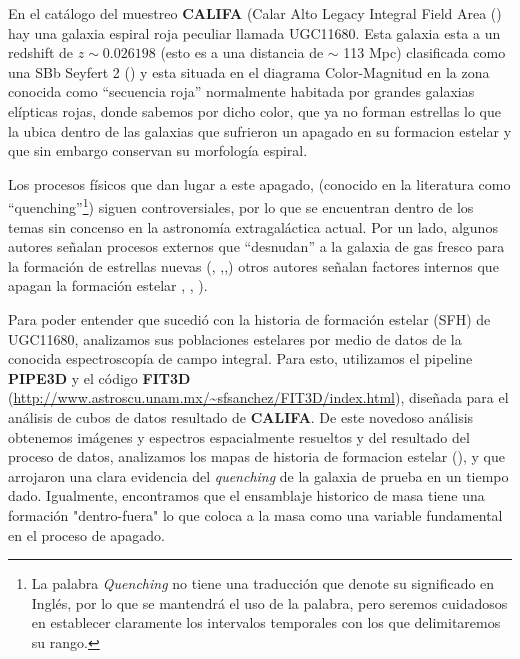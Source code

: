 


\begin{abstracts}        %

En el catálogo del muestreo \textbf{CALIFA} (Calar Alto Legacy Integral Field Area  (\citet{sanchez2012}) hay una galaxia espiral roja peculiar llamada UGC11680. Esta galaxia esta a un redshift de $z \sim 0.026198$ (esto es a una distancia de $\sim$ 113 Mpc)  clasificada como una SBb Seyfert 2 (\citet{blazquez2007}) y esta situada en el diagrama Color-Magnitud en la zona conocida como ``secuencia roja'' normalmente habitada por grandes galaxias elípticas rojas, donde sabemos por dicho color, que ya no forman estrellas lo que la ubica dentro de las galaxias que sufrieron un apagado en su formacion estelar y que sin embargo conservan su morfología espiral. 

Los procesos físicos que dan lugar a este apagado, (conocido en la literatura como ``quenching''\footnote{La palabra \textsl{Quenching} no tiene una traducción que denote su significado en Inglés, por lo que se mantendrá el uso de la palabra, pero seremos cuidadosos en establecer claramente los intervalos temporales con los que delimitaremos su rango.}) siguen controversiales, por lo que se encuentran dentro de los temas sin concenso  en la astronomía extragaláctica actual. Por un lado, algunos autores señalan procesos externos que  ``desnudan'' a la galaxia de gas fresco para la formación de estrellas nuevas  (\citet{salim2007}, \citet{noeske2007},\citet{peng2010},\citet{dimatteo2005}) otros autores señalan factores internos que apagan la formación estelar \citet{martin2007}, \citet{nandra2007}, \citet{schawinski2007}).

Para poder entender que sucedió con  la historia de 
formación estelar (SFH) de   UGC11680, analizamos sus poblaciones estelares por medio de
datos de la conocida espectroscopía de campo integral. Para esto, utilizamos el pipeline \textbf{PIPE3D} y el código \textbf{FIT3D} (\url{http://www.astroscu.unam.mx/~sfsanchez/FIT3D/index.html}), diseñada para el análisis de cubos de datos resultado de \textbf{CALIFA}. De este novedoso análisis obtenemos imágenes y espectros  espacialmente resueltos y del resultado del proceso de datos, analizamos  
los mapas de historia de formacion estelar (\citet{cid2013_1}), y que arrojaron una clara evidencia del \textsl{quenching}
de la  galaxia de prueba en un tiempo dado. Igualmente, encontramos que el ensamblaje historico de masa tiene una formación "dentro-fuera" lo que coloca a la masa como una variable fundamental en el proceso de apagado.


\end{abstracts}
